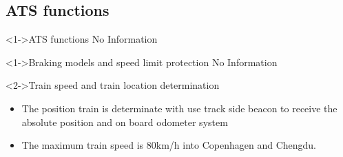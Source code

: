 
\subsection{ATS functions}
\frame
{

  
\begin{block}<1->{ATS functions}
No Information
\end{block}
   \begin{block}<1->{Braking models and speed limit protection}
No Information

   \end{block}
   
      \begin{block}<2->{Train speed and train location determination}
      \begin{itemize}
      \item The position train is determinate with use track side beacon to receive the absolute position and on board odometer system 
      \item The maximum train speed is 80km/h into Copenhagen and Chengdu.
\end{itemize}
  \end{block}
}



  


   




 


